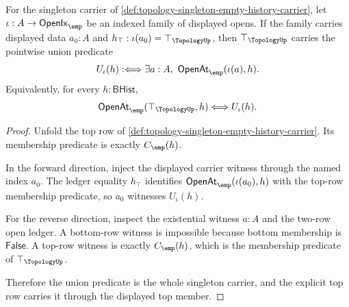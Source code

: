 \begin{theorem}
\label{thm:topology-singleton-union-top-exactness}
For the singleton carrier of \autoref{def:topology-singleton-empty-history-carrier}, let $\iota:A\to\mathsf{OpenIx}_{\emp}$ be an indexed family of displayed opens. If the family carries displayed data $a_0:A$ and $h_{\top}:\iota(a_0)=\top_{\TopologyUp}$,
then $\top_{\TopologyUp}$ carries the pointwise union predicate
$$
U_{\iota}(h):\Longleftrightarrow
\exists a:A,\ \mathsf{OpenAt}_{\emp}(\iota(a),h).
$$
Equivalently, for every $h:\mathsf{BHist}$,
$$
\mathsf{OpenAt}_{\emp}(\top_{\TopologyUp},h)
\Longleftrightarrow
U_{\iota}(h).
$$
\end{theorem}
\begin{proof}
Unfold the top row of \autoref{def:topology-singleton-empty-history-carrier}. Its membership predicate is exactly $C_{\emp}(h)$.

In the forward direction, inject the displayed carrier witness through the named index $a_0$. The ledger equality $h_{\top}$ identifies $\mathsf{OpenAt}_{\emp}(\iota(a_0),h)$ with the top-row membership predicate, so $a_0$ witnesses $U_{\iota}(h)$.

For the reverse direction, inspect the existential witness $a:A$ and the two-row open ledger. A bottom-row witness is impossible because bottom membership is $\mathsf{False}$. A top-row witness is exactly $C_{\emp}(h)$, which is the membership predicate of $\top_{\TopologyUp}$.

Therefore the union predicate is the whole singleton carrier, and the explicit top row carries it through the displayed top member.
\end{proof}

